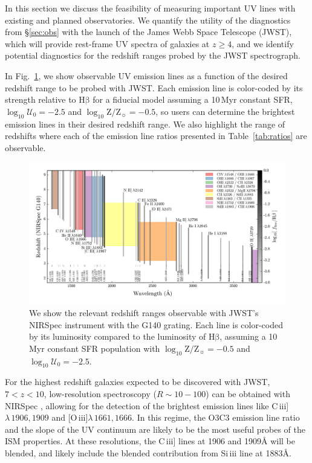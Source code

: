 \documentclass[preprint2,trackchanges]{aastex62}
\newcommand{\oiii}{[O\,{\sc iii}]\xspace}
\newcommand{\ciii}{C\,{\sc iii}]\xspace}
\newcommand{\hb}{\ensuremath{\mathrm{H\beta}}\xspace}
\newcommand{\Myr}{$\,$Myr\xspace}
\newcommand{\logten}{\ensuremath{\log_{10}}}
\newcommand{\logZeq}[1]{\ensuremath{\logten \mathrm{Z}/\mathrm{Z}_{\sun} = #1}}
\newcommand{\ang}{\ensuremath{\mbox{\AA}}\xspace}
\newcommand{\logUeq}[1]{\ensuremath{\logten \mathcal{U}_0 = #1}}
\begin{document}
In this section we discuss the feasibility of measuring important UV lines with existing and planned observatories. We quantify the utility of the diagnostics from \S\ref{sec:obs} with the launch of the James Webb Space Telescope (JWST), which will provide rest-frame UV spectra of galaxies at $z \geq 4$, and we identify potential diagnostics for the redshift ranges probed by the JWST spectrograph.

In Fig.~\ref{fig:jwst}, we show observable UV emission lines as a function of the desired redshift range to be probed with JWST. Each emission line is color-coded by its strength relative to \hb for a fiducial model assuming a 10\Myr constant SFR, \logUeq{-2.5} and \logZeq{-0.5}, so users can determine the brightest emission lines in their desired redshift range. We also highlight the range of redshifts where each of the emission line ratios presented in Table~\ref{tab:ratios} are observable.

\begin{figure}
  \begin{center}
    \includegraphics[width=\linewidth]{figs/f20.png}
    \caption{We show the relevant redshift ranges observable with JWST's NIRSpec instrument with the G140 grating. Each line is color-coded by its luminosity compared to the luminosity of \hb, assuming a 10\Myr constant SFR population with \logZeq{-0.5} and \logUeq{-2.5}.}
    \label{fig:jwst}
  \end{center}
\end{figure}

For the highest redshift galaxies expected to be discovered with JWST, $7 < z < 10$, low-resolution spectroscopy ($R\sim10-100$) can be obtained with NIRSpec \citep{Levesque+2015n}, allowing for the detection of the brightest emission lines like \ciii$\lambda\,1906,1909$ and \oiii$\lambda\,1661,1666$. In this regime, the O3C3 emission line ratio and the slope of the UV continuum are likely to be the most useful probes of the ISM properties. At these resolutions, the \ciii lines at 1906 and 1909\ang will be blended, and likely include the blended contribution from Si{\sc \,iii} line at 1883\ang.
\end{document}
